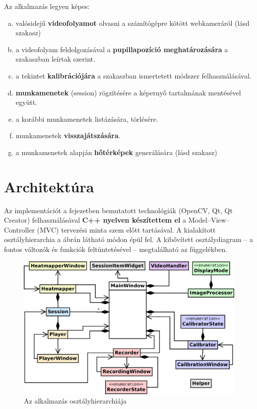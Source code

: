 \bigskip

Az alkalmazás legyen képes:

\begin{enumerate}[a)]
  \item valósidejű \textbf{videofolyamot} olvasni a számítógépre kötött webkameráról (lásd  szakasz)
  \item a videofolyam feldolgozásával a \textbf{pupillapozíció meghatározására} a  szakaszban leírtak szerint.
  \item a tekintet \textbf{kalibrációjára} a  szakaszban ismertetett módszer felhasználásával.
  \item \textbf{munkamenetek} (session) rögzítésére a képernyő tartalmának mentésével együtt.
  \item a korábbi munkamenetek listázására, törlésére.
  \item munkamenetek \textbf{visszajátszására}.
  \item a munkamenetek alapján \textbf{hőtérképek} generálására (lásd  szakasz)
\end{enumerate}

\section{Architektúra}\label{sect:architektura}
  
  Az implementációt a  fejezetben bemutatott technológiák (OpenCV, Qt, Qt Creator) felhasználásával \textbf{C++ nyelven készítettem el} a Model--View--Controller (MVC) tervezési minta szem előtt tartásával. A kialakított osztályhierarchia a  ábrán látható módon épül fel. A kibővített osztálydiagram  -- a fontos változók és funkciók feltüntetésével -- megtalálható az  függelékben.

\begin{figure}[!ht]
\centering
\includegraphics[width=140mm, keepaspectratio]{figures/overview_aa.png}
\caption{Az alkalmazás osztályhierarchiája}
\label{fig:overview}
\end{figure}

